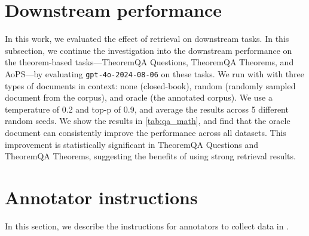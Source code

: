 \section{Downstream performance}
\label{app:downstream}
In this work, we evaluated the effect of retrieval on downstream tasks.
In this subsection, we continue the investigation into the downstream performance on the theorem-based tasks---TheoremQA Questions, TheoremQA Theorems, and AoPS---by evaluating \texttt{gpt-4o-2024-08-06} on these tasks.
We run with with three types of documents in context: none (closed-book), random (randomly sampled document from the corpus), and oracle (the annotated corpus).
We use a temperature of 0.2 and top-p of 0.9, and average the results across 5 different random seeds.
We show the results in \ref{tab:qa_math}, and find that the oracle document can consistently improve the performance across all datasets.
This improvement is statistically significant in TheoremQA Questions and TheoremQA Theorems, suggesting the benefits of using strong retrieval results.

\section{Annotator instructions}
\label{app:annotator_instruction}
In this section, we describe the instructions for annotators to collect data in \ours.
